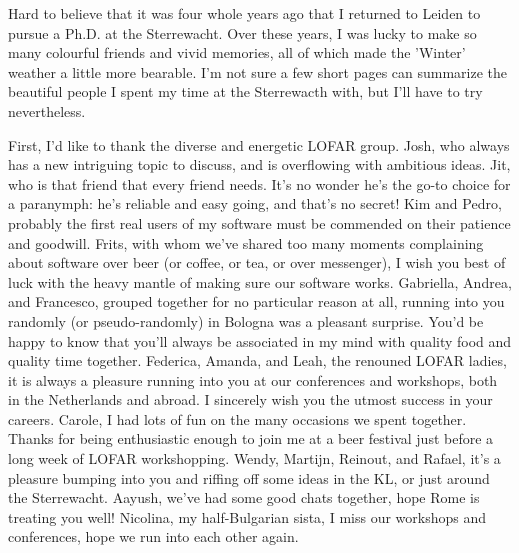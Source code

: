 \cleardoublepage
{}
{}
\begin{thesisacknowledgements}


    \newcommand{\bees}[1]{\texttt{[image: coloremoji.sty/emoji\_images/hires/\#1.pdf]}}

Hard to believe that it was four whole years ago that I returned to Leiden to pursue a Ph.D. at the Sterrewacht. Over these years, I was lucky to make so many colourful friends and vivid memories, all of which made the 'Winter' weather a little more bearable. I'm not sure a few short pages can summarize the beautiful people I spent my time at the Sterrewacth with, but I'll have to try nevertheless.

    First, I'd like to thank the diverse and energetic LOFAR group. Josh, who always has a new intriguing topic to discuss, and is overflowing with ambitious ideas. Jit, who is that friend that every friend needs. It's no wonder he's the go-to choice for a paranymph: he's reliable and easy going, and that's no secret! Kim and Pedro, probably the first real users of my software must be commended on their patience and goodwill. Frits, with whom we've shared too many moments complaining about software over beer (or coffee, or tea, or over messenger), I wish you best of luck with the heavy mantle of making sure our software works. Gabriella, Andrea, and Francesco, grouped together for no particular reason at all, running into you randomly (or pseudo-randomly) in Bologna was a pleasant surprise. You'd be happy to know that you'll always be associated in my mind with quality food and quality time together. Federica, Amanda, and Leah, the renouned LOFAR ladies, it is always a pleasure running into you at our conferences and workshops, both in the Netherlands and abroad. I sincerely wish you the utmost success in your careers. Carole, I had lots of fun on the many occasions we spent together. Thanks for being enthusiastic enough to join me at a beer festival just before a long week of LOFAR workshopping. Wendy, Martijn, Reinout, and Rafael, it's a pleasure bumping into you and riffing off some ideas in the KL, or just around the Sterrewacht. Aayush, we've had some good chats together, hope Rome is treating you well! Nicolina, my half-Bulgarian sista, I miss our workshops and conferences, hope we run into each other again.


\end{thesisacknowledgements}
